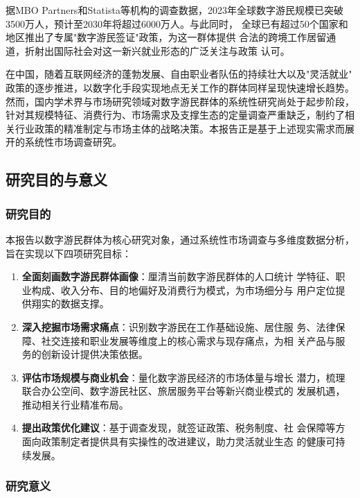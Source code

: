 \documentclass[12pt,a4paper]{article}
\begin{document}
据MBO Partners和Statista等机构的调查数据，2023年全球数字游民规模已突破
3500万人，预计至2030年将超过6000万人\citep{StatistaNomads2024}。与此同时，
全球已有超过50个国家和地区推出了专属"数字游民签证"政策，为这一群体提供
合法的跨境工作居留通道，折射出国际社会对这一新兴就业形态的广泛关注与政策
认可。

在中国，随着互联网经济的蓬勃发展、自由职业者队伍的持续壮大以及"灵活就业"
政策的逐步推进，以数字化手段实现地点无关工作的群体同样呈现快速增长趋势。
然而，国内学术界与市场研究领域对数字游民群体的系统性研究尚处于起步阶段，
针对其规模特征、消费行为、市场需求及支撑生态的定量调查严重缺乏，制约了相
关行业政策的精准制定与市场主体的战略决策。本报告正是基于上述现实需求而展
开的系统性市场调查研究。

\subsection{研究目的与意义}

\subsubsection{研究目的}

本报告以数字游民群体为核心研究对象，通过系统性市场调查与多维度数据分析，
旨在实现以下四项研究目标：

\begin{enumerate}[label=\arabic*.]
  \item \textbf{全面刻画数字游民群体画像}：厘清当前数字游民群体的人口统计
        学特征、职业构成、收入分布、目的地偏好及消费行为模式，为市场细分与
        用户定位提供翔实的数据支撑。

  \item \textbf{深入挖掘市场需求痛点}：识别数字游民在工作基础设施、居住服
        务、法律保障、社交连接和职业发展等维度上的核心需求与现存痛点，为相
        关产品与服务的创新设计提供决策依据。

  \item \textbf{评估市场规模与商业机会}：量化数字游民经济的市场体量与增长
        潜力，梳理联合办公空间、数字游民社区、旅居服务平台等新兴商业模式的
        发展机遇，推动相关行业精准布局。

  \item \textbf{提出政策优化建议}：基于调查发现，就签证政策、税务制度、社
        会保障等方面向政策制定者提供具有实操性的改进建议，助力灵活就业生态
        的健康可持续发展。
\end{enumerate}

\subsubsection{研究意义}
\end{document}
